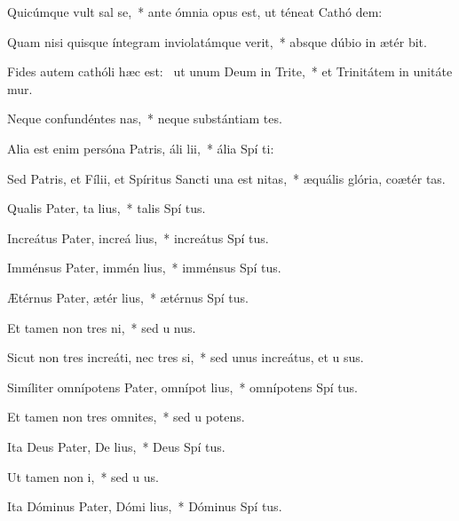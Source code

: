 \item Quicúmque vult sal se,~* ante ómnia opus est, ut téneat Cathó dem:
\item Quam nisi quisque íntegram inviolatámque verit,~* absque dúbio in ætér bit.
\item Fides autem cathóli hæc est:~\pscross{} ut unum Deum in Trite,~* et Trinitátem in unitáte mur.
\item Neque confundéntes nas,~* neque substántiam tes.
\item Alia est enim persóna Patris, áli lii,~* ália Spí ti:
\item Sed Patris, et Fílii, et Spíritus Sancti una est nitas,~* æquális glória, coætér tas.
\item Qualis Pater, ta lius,~* talis Spí tus.
\item Increátus Pater, increá lius,~* increátus Spí tus.
\item Imménsus Pater, immén lius,~* imménsus Spí tus.
\item Ætérnus Pater, ætér lius,~* ætérnus Spí tus.
\item Et tamen non tres ni,~* sed u nus.
\item Sicut non tres increáti, nec tres si,~* sed unus increátus, et u sus.
\item Simíliter omnípotens Pater, omnípot lius,~* omnípotens Spí tus.
\item Et tamen non tres omnites,~* sed u potens.
\item Ita Deus Pater, De lius,~* Deus Spí tus.
\item Ut tamen non  i,~* sed u  us.
\item Ita Dóminus Pater, Dómi lius,~* Dóminus Spí tus.

